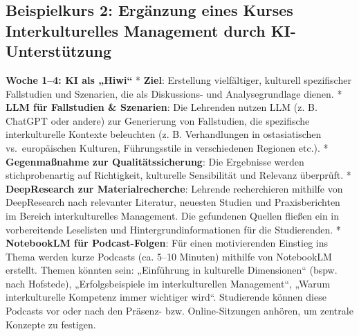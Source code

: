 \documentclass[
  ngerman,
  letterpaper,
  DIV=11]{scrreprt}
\begin{document}
\subsection{Beispielkurs 2: Ergänzung eines Kurses Interkulturelles
Management durch
KI-Unterstützung}\label{beispielkurs-2-erguxe4nzung-eines-kurses-interkulturelles-management-durch-ki-unterstuxfctzung}

\textbf{Woche 1--4: KI als „Hiwi``} * \textbf{Ziel}: Erstellung
vielfältiger, kulturell spezifischer Fallstudien und Szenarien, die als
Diskussions- und Analysegrundlage dienen. * \textbf{LLM für Fallstudien
\& Szenarien}: Die Lehrenden nutzen LLM (z. B. ChatGPT oder andere) zur
Generierung von Fallstudien, die spezifische interkulturelle Kontexte
beleuchten (z. B. Verhandlungen in ostasiatischen vs.~europäischen
Kulturen, Führungsstile in verschiedenen Regionen etc.). *
\textbf{Gegenmaßnahme zur Qualitätssicherung}: Die Ergebnisse werden
stichprobenartig auf Richtigkeit, kulturelle Sensibilität und Relevanz
überprüft. * \textbf{DeepResearch zur Materialrecherche}: Lehrende
recherchieren mithilfe von DeepResearch nach relevanter Literatur,
neuesten Studien und Praxisberichten im Bereich interkulturelles
Management. Die gefundenen Quellen fließen ein in vorbereitende
Leselisten und Hintergrundinformationen für die Studierenden. *
\textbf{NotebookLM für Podcast-Folgen}: Für einen motivierenden Einstieg
ins Thema werden kurze Podcasts (ca. 5--10 Minuten) mithilfe von
NotebookLM erstellt. Themen könnten sein: „Einführung in kulturelle
Dimensionen`` (bspw. nach Hofstede), „Erfolgsbeispiele im
interkulturellen Management``, „Warum interkulturelle Kompetenz immer
wichtiger wird``. Studierende können diese Podcasts vor oder nach den
Präsenz- bzw. Online-Sitzungen anhören, um zentrale Konzepte zu
festigen.
\end{document}
